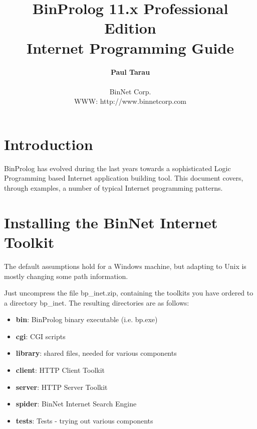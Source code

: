 \documentclass{article}
\begin{document}
\pagestyle{plain}




\title{
\Huge
BinProlog 11.x Professional Edition\\
Internet Programming Guide
\vskip 5cm
}

\author{
\Large
  {\bf Paul Tarau}\\\\
\large
  BinNet Corp.\\
  WWW: http://www.binnetcorp.com
\normalsize
}



\vskip 5cm
\maketitle

\newpage

\section{Introduction}

BinProlog has evolved during the last years towards a sophisticated Logic Programming
based Internet application building tool.
This document covers, through examples, a number of typical Internet programming
patterns.


\section{Installing the BinNet Internet Toolkit}

The default assumptions hold for a Windows machine, but adapting
to Unix is mostly changing some path information.

Just uncompress the file bp\_inet.zip, containing the toolkits you have ordered
to a directory bp\_inet. The resulting directories are as follows:

\begin{itemize}
\item {\bf bin}: BinProlog binary executable (i.e. bp.exe)
\item {\bf cgi}: CGI scripts
\item {\bf library}: shared files, needed for various components
\item {\bf client}: HTTP Client Toolkit
\item {\bf server}: HTTP Server Toolkit
\item {\bf spider}: BinNet Internet Search Engine
\item {\bf tests}: Tests - trying out various components
\end{itemize}
\end{document}
